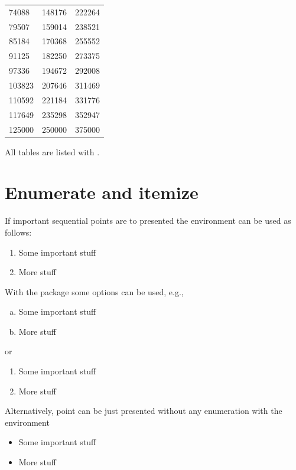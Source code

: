 \documentclass[9pt,a4paper,oneside]{extbook}
\begin{document}
\begin{center}
\begin{longtable}{l|l|l}
 74088 & 148176 & 222264 \\
 79507 & 159014 & 238521 \\
 85184 & 170368 & 255552 \\
 91125 & 182250 & 273375 \\
 97336 & 194672 & 292008 \\
 103823 & 207646 & 311469 \\
 110592 & 221184 & 331776 \\
 117649 & 235298 & 352947 \\
 125000 & 250000 & 375000 \\
\end{longtable}
\end{center}

All tables are listed with .

\section{Enumerate and itemize}

If important sequential points are to presented the environment  can be used as follows:
\begin{enumerate}
\item
	Some important stuff
\item
	More stuff
\end{enumerate}
With the package  some options can be used, e.g.,
\begin{enumerate}[a)]
\item
	Some important stuff
\item
	More stuff
\end{enumerate}
or 
\begin{enumerate}[~~~1)]
\item
	Some important stuff
\item
	More stuff
\end{enumerate}

Alternatively, point can be just presented without any enumeration with the environment 
\begin{itemize}
\item
	Some important stuff
\item
	More stuff
\end{itemize}
\end{document}
